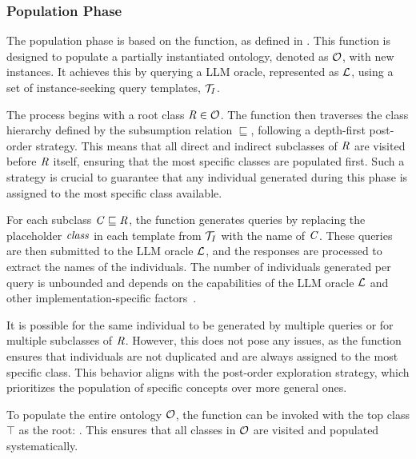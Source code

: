 \subsubsection{Population Phase}
\label{subsubsec:population-phase}
%

%
The population phase is based on the \populate{} function, as defined in .
%
This function is designed to populate a partially instantiated ontology, denoted as $\relset{O}$, with new instances.
%
It achieves this by querying a \gls{LLM} oracle, represented as $\relset{L}$, using a set of instance-seeking query templates, $\relset{T}_{I}$.


The process begins with a root class $\concept{R} \in \relset{O}$.
%
The function then traverses the class hierarchy defined by the subsumption relation $\sqsubseteq$, following a depth-first post-order strategy.
%
This means that all direct and indirect subclasses of $\concept{R}$ are visited before $\concept{R}$ itself, ensuring that the most specific classes are populated first.
%
Such a strategy is crucial to guarantee that any individual generated during this phase is assigned to the most specific class available.


For each subclass $\concept{C} \sqsubseteq \concept{R}$, the function generates queries by replacing the placeholder $\mathit{class}$ in each template from $\relset{T}_{I}$ with the name of $\concept{C}$.
%
These queries are then submitted to the \gls{LLM} oracle $\relset{L}$, and the responses are processed to extract the names of the individuals.
%
The number of individuals generated per query is unbounded and depends on the capabilities of the \gls{LLM} oracle $\relset{L}$ and other implementation-specific factors~\cite{placeholder}.


It is possible for the same individual to be generated by multiple queries or for multiple subclasses of $\concept{R}$.
%
However, this does not pose any issues, as the \addToClass{} function ensures that individuals are not duplicated and are always assigned to the most specific class.
%
This behavior aligns with the post-order exploration strategy, which prioritizes the population of specific concepts over more general ones.


To populate the entire ontology $\relset{O}$, the function can be invoked with the top class $\top$ as the root:
%
.
%
This ensures that all classes in $\relset{O}$ are visited and populated systematically.


